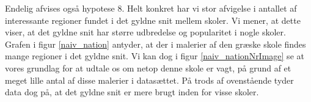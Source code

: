{Endelig afvises også hypotese 8. Helt konkret har vi stor afvigelse i
antallet af interessante regioner fundet i det gyldne snit mellem
skoler. Vi mener, at dette viser, at det gyldne snit har større
udbredelse og popularitet i nogle skoler. Grafen i figur
\ref{naiv_nation} antyder, at der i malerier af den græske skole findes
mange regioner i det gyldne snit. Vi kan dog i figur
\ref{naiv_nationNrImage} se at vores grundlag for at udtale os om netop
denne skole er vagt, på grund af et meget lille antal af disse malerier
i datasættet. På trods af ovenstående tyder data dog på, at det gyldne
snit er mere brugt inden for visse skoler.

}


